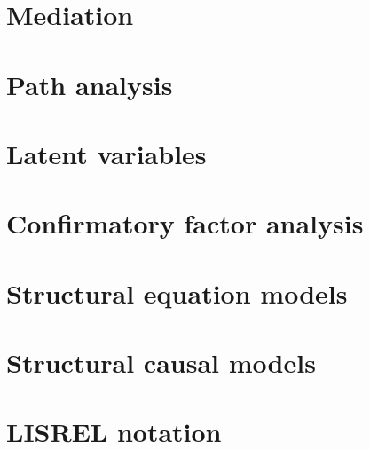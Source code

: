 \documentclass[
]{book}
\begin{document}
\hypertarget{mediation}{%
\chapter{Mediation}\label{mediation}}

\hypertarget{path-analysis}{%
\chapter{Path analysis}\label{path-analysis}}

\hypertarget{latent-variables}{%
\chapter{Latent variables}\label{latent-variables}}

\hypertarget{confirmatory-factor-analysis}{%
\chapter{Confirmatory factor analysis}\label{confirmatory-factor-analysis}}

\hypertarget{structural-equation-models}{%
\chapter{Structural equation models}\label{structural-equation-models}}

\hypertarget{structural-causal-models}{%
\chapter{Structural causal models}\label{structural-causal-models}}

\hypertarget{appendix-appendix}{%
\appendix}


\hypertarget{lisrel-notation}{%
\chapter{LISREL notation}\label{lisrel-notation}}

  
\end{document}
